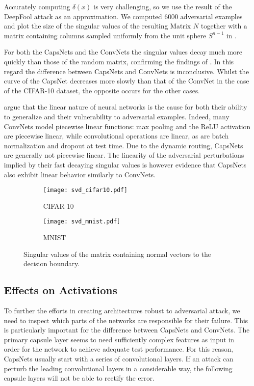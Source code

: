 Accurately computing $\delta(x)$ is very challenging, so we use the result of the DeepFool attack as an approximation.
We computed $6000$ adversarial examples and plot the size of the singular values of the resulting Matrix $N$ together with a matrix containing columns sampled uniformly from the unit sphere $S^{n-1}$ in .

For both the CapsNets and the ConvNets the singular values decay much more quickly than those of the random matrix, confirming the findings of \citet{universal}.
In this regard the difference between CapsNets and ConvNets is inconclusive.
Whilst the curve of the CapsNet decreases more slowly than that of the ConvNet in the case of the CIFAR-10 dataset, the opposite occurs for the other cases.

\citet{fgsm} argue that the linear nature of neural networks is the cause for both their ability to generalize and their vulnerability to adversarial examples.
Indeed, many ConvNets model piecewise linear functions: max pooling and the ReLU activation are piecewise linear, while convolutional operations are linear, as are batch normalization and dropout at test time.
Due to the dynamic routing, CapsNets are generally not piecewise linear.
The linearity of the adversarial perturbations implied by their fast decaying singular values is however evidence that CapsNets also exhibit linear behavior similarly to ConvNets.

\begin{figure}
	\centering
	\begin{subfigure}{.5\textwidth}
		\texttt{[image: svd\_cifar10.pdf]}
		\caption{CIFAR-10}
	\end{subfigure}%
	\begin{subfigure}{.5\textwidth}
		\texttt{[image: svd\_mnist.pdf]}
		\caption{MNIST}
	\end{subfigure}
	
	\caption[Singular values of adversarial perturbations]{Singular values of the matrix containing normal vectors to the decision boundary.}
	\label{fig:svd}
\end{figure}

\subsection{Effects on Activations}

To further the efforts in creating architectures robust to adversarial attack, we need to inspect which parts of the networks are responsible for their failure.
This is particularly important for the difference between CapsNets and ConvNets.
The primary capsule layer seems to need sufficiently complex features as input in order for the network to achieve adequate test performance.
For this reason, CapsNets usually start with a series of convolutional layers.
If an attack can perturb the leading convolutional layers in a considerable way, the following capsule layers will not be able to rectify the error.


